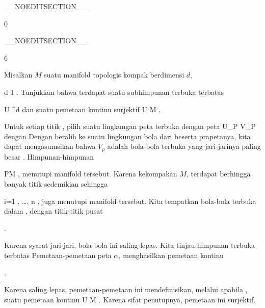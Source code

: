 __NOEDITSECTION__

{0}

{

}
{  }

__NOEDITSECTION__

{6}

{

Misalkan $M$ suatu manifold topologis kompak berdimensi $d$,

\mavergleichskette
{\vergleichskette
{ d
}
{ \geq }{ 1
}
{  }{
}
{    }{
}
{   }{
}
}
{}{}{.}
Tunjukkan bahwa terdapat suatu subhimpunan terbuka terbatas

\mavergleichskette
{\vergleichskette
{ U
}
{ \subseteq }{ \R^d
}
{  }{
}
{    }{
}
{   }{
}
}
{}{}{}
dan suatu pemetaan kontinu surjektif
\maabbdisp {\varphi} { U } { M
} {}
.

}
{

Untuk setiap titik
, pilih suatu lingkungan peta terbuka
 dengan peta
 {U_P } {V_P
} {}
dengan
 Dengan beralih ke suatu lingkungan bola dari
 beserta prapetanya, kita dapat mengasumsikan bahwa $V_p$ adalah bola-bola terbuka yang jari-jarinya paling besar
. Himpunan-himpunan

 {}
 {P\in M} {}
 {} {} {} {,}
menutupi manifold tersebut. Karena kekompakan $M$, terdapat berhingga banyak titik
 sedemikian sehingga

 {}
 {i=1 , \ldots , n} {}
 {} {} {} {,}
juga menutupi manifold tersebut. Kita tempatkan bola-bola terbuka
 dalam
 {} {},
dengan titik-titik pusat

 { . }

Karena syarat jari-jari, bola-bola ini saling lepas. Kita tinjau himpunan terbuka terbatas
 Pemetaan-pemetaan peta $\alpha_i$ menghasilkan pemetaan kontinu

 { . }

Karena saling lepas, pemetaan-pemetaan ini mendefinisikan, melalui
 apabila
, suatu pemetaan kontinu
\maabbdisp {\varphi} { U } {M
} {.}
Karena sifat penutupnya, pemetaan ini surjektif.

 }

